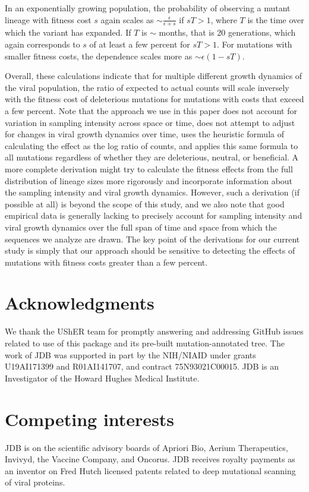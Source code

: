 \documentclass[9pt,twocolumn,twoside]{gsajnl_modified}
\begin{document}
{In an exponentially growing population, the probability of observing a mutant lineage with fitness cost $s$ again scales as $\sim \frac{\epsilon}{\epsilon + s}$ if $sT>1$, where $T$ is the time over which the variant has expanded.
If $T$ is $\sim$ months, that is 20 generations, which again corresponds to $s$ of at least a few percent for $sT > 1$.
For mutations with smaller fitness costs, the dependence scales more as $\sim \epsilon\left(1-sT\right)$.

Overall, these calculations indicate that for multiple different growth dynamics of the viral population, the ratio of expected to actual counts will scale inversely with the fitness cost of deleterious mutations for mutations with costs that exceed a few percent.
Note that the approach we use in this paper does not account for variation in sampling intensity across space or time, does not attempt to adjust for changes in viral growth dynamics over time, uses the heuristic formula of calculating the effect as the log ratio of counts, and applies this same formula to all mutations regardless of whether they are deleterious, neutral, or beneficial.
A more complete derivation might try to calculate the fitness effects from the full distribution of lineage sizes more rigorously and incorporate information about the sampling intensity and viral growth dynamics.
However, such a derivation (if possible at all) is beyond the scope of this study, and we also note that good empirical data is generally lacking to precisely account for sampling intensity and viral growth dynamics over the full span of time and space from which the sequences we analyze are drawn.
The key point of the derivations for our current study is simply that our approach should be sensitive to detecting the effects of mutations with fitness costs greater than a few percent.

\section{Acknowledgments}
We thank the UShER team for promptly answering and addressing GitHub issues related to use of this package and its pre-built mutation-annotated tree.
The work of JDB was supported in part by the NIH/NIAID under grants U19AI171399 and R01AI141707, and contract 75N93021C00015.
JDB is an Investigator of the Howard Hughes Medical Institute.

\section{Competing interests}
JDB is on the scientific advisory boards of Apriori Bio, Aerium Therapeutics, Invivyd, the Vaccine Company, and Oncorus.
JDB receives royalty payments as an inventor on Fred Hutch licensed patents related to deep mutational scanning of viral proteins.


}
\end{document}
